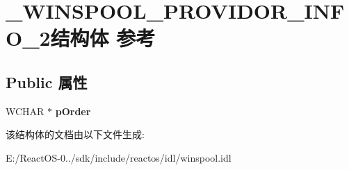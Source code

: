 \hypertarget{struct___w_i_n_s_p_o_o_l___p_r_o_v_i_d_o_r___i_n_f_o__2}{}\section{\+\_\+\+W\+I\+N\+S\+P\+O\+O\+L\+\_\+\+P\+R\+O\+V\+I\+D\+O\+R\+\_\+\+I\+N\+F\+O\+\_\+2结构体 参考}
\label{struct___w_i_n_s_p_o_o_l___p_r_o_v_i_d_o_r___i_n_f_o__2}
\subsection*{Public 属性}
\begin{DoxyCompactItemize}
\item 
\mbox{\label{struct___w_i_n_s_p_o_o_l___p_r_o_v_i_d_o_r___i_n_f_o__2_a80b037279d3277097ff65d5b367996a9}} 
W\+C\+H\+AR $\ast$ {\bfseries p\+Order}
\end{DoxyCompactItemize}


该结构体的文档由以下文件生成\+:\begin{DoxyCompactItemize}
\item 
E\+:/\+React\+O\+S-\/0../sdk/include/reactos/idl/winspool.\+idl\end{DoxyCompactItemize}
